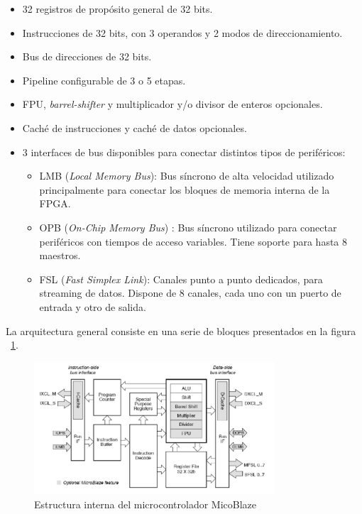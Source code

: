 	\begin{itemize}
	  \item  32 registros de propósito general de 32 bits.
	  \item  Instrucciones de 32 bits, con 3 operandos y 2 modos de direccionamiento.
	  \item  Bus de direcciones de 32 bits.
	  \item  Pipeline configurable de 3 o 5 etapas.
	  \item  FPU,\textit{ barrel-shifter} y multiplicador y/o divisor de enteros opcionales.
	  \item  Caché de instrucciones y caché de datos opcionales.
	  \item   3 interfaces de bus disponibles para conectar distintos tipos de periféricos:
		\begin{itemize}
		  \item  LMB \cite{Etiqueta23}(\textit{Local Memory Bus}): Bus síncrono de alta velocidad utilizado principalmente para conectar los bloques de memoria interna de la FPGA.
	 	 \item  OPB \cite{Etiqueta24}(\textit{On-Chip Memory Bus}) : Bus síncrono utilizado para conectar periféricos con tiempos de acceso variables. Tiene soporte para hasta 8 maestros.
	 	 \item FSL\cite{Etiqueta25} (\textit{Fast Simplex Link}): Canales punto a punto dedicados, para streaming de datos. Dispone de 8 canales, cada uno con un puerto de entrada y otro de salida.
		\end{itemize}
	\end{itemize}

La arquitectura general consiste en una serie de bloques presentados en la figura ~\ref{fig:MicoBlazer}.
		
	\begin{figure}[h!]
 	\begin{center}
  	\includegraphics[width=0.8\textwidth,keepaspectratio=true]{./images/estructuramicroblazer}
  	\caption{Estructura interna del microcontrolador MicoBlaze}
  	\label{fig:MicoBlazer}
 	\end{center}
	\end{figure}

